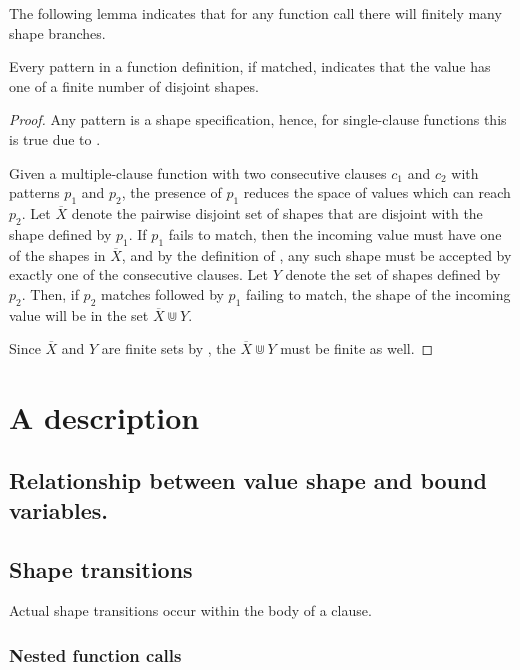 The following lemma indicates that for any function call there will finitely
many shape branches.

\begin{lemma}\label{lemma:extend-clause-finite} Every pattern in a function
definition, if matched, indicates that the value has one of a finite number of
disjoint shapes.\end{lemma}

\begin{proof} Any pattern is a shape specification, hence, for single-clause
functions this is true due to .

Given a multiple-clause function with two consecutive clauses $c_1$ and $c_2$
with patterns $p_1$ and $p_2$, the presence of $p_1$ reduces the space of
values which can reach $p_2$. Let $\overline{X}$ denote the pairwise disjoint
set of shapes that are disjoint with the shape defined by $p_1$. If $p_1$ fails
to match, then the incoming value must have one of the shapes in
$\overline{X}$, and by the definition of \D{}, any such shape must be accepted
by exactly one of the consecutive clauses. Let $Y$ denote the set of shapes
defined by $p_2$. Then, if $p_2$ matches followed by $p_1$ failing to match,
the shape of the incoming value will be in the set $\overline{X}\Cup Y$.

Since $\overline{X}$ and $Y$ are finite sets by
, the $\overline{X}\Cup Y$ must be finite
as well.\end{proof}

\section{A description}

\subsection{Relationship between value shape and bound variables.}

\subsection{Shape transitions}

Actual shape transitions occur within the body of a clause.

\subsubsection{Nested function calls}

